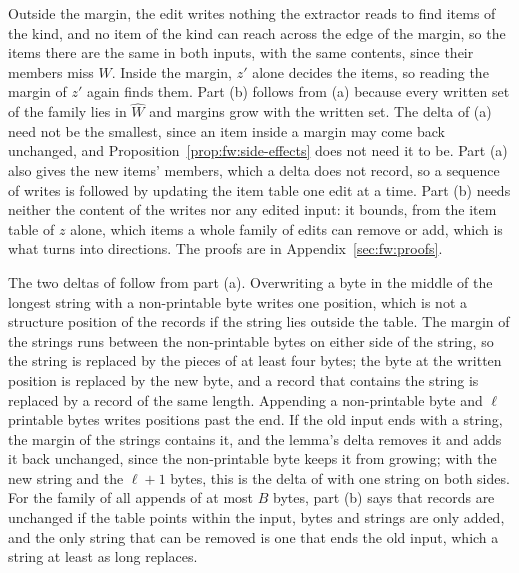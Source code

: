 \noindent Outside the margin, the edit writes nothing the extractor reads to find items of the kind, and no item of
the kind can reach across the edge of the margin, so the items there are the same in both inputs, with the same
contents, since their members miss $W$. Inside the margin, $z'$ alone decides the items, so reading the margin of $z'$
again finds them. Part (b) follows from (a) because every written set of the family lies in $\hat{W}$ and margins grow
with the written set. The delta of (a) need not be the smallest, since an item inside a margin may come back
unchanged, and Proposition~\ref{prop:fw:side-effects} does not need it to be. Part (a) also gives the new items'
members, which a delta does not record, so a sequence of writes is followed by updating the item table one edit at a
time. Part (b) needs neither the content of the writes nor any edited input: it bounds, from the item table of $z$
alone, which items a whole family of edits can remove or add, which is what  turns into
directions. The proofs are in Appendix~\ref{sec:fw:proofs}.
\begin{runex}
The two deltas of  follow from part (a). Overwriting a byte in the middle of the longest
string with a non-printable byte writes one position, which is not a structure position of the records if the string
lies outside the table. The margin of the strings runs between the non-printable bytes on either side of the string, so the string is replaced by the pieces of at
least four bytes; the byte at the written position is replaced by the new byte, and a record that contains the string
is replaced by a record of the same length. Appending a non-printable byte and $\ell$ printable bytes writes positions
past the end. If the old input ends with a string, the margin of the strings contains it, and the lemma's delta
removes it and adds it back unchanged, since the non-printable byte keeps it from growing; with the new string and the
$\ell + 1$ bytes, this is the delta of  with one string on both sides. For the family of all
appends of at most $B$ bytes, part (b) says that records are unchanged if the table points within the input, bytes and
strings are only added, and the only string that can be removed is one that ends the old input, which a string at
least as long replaces.
\end{runex}

